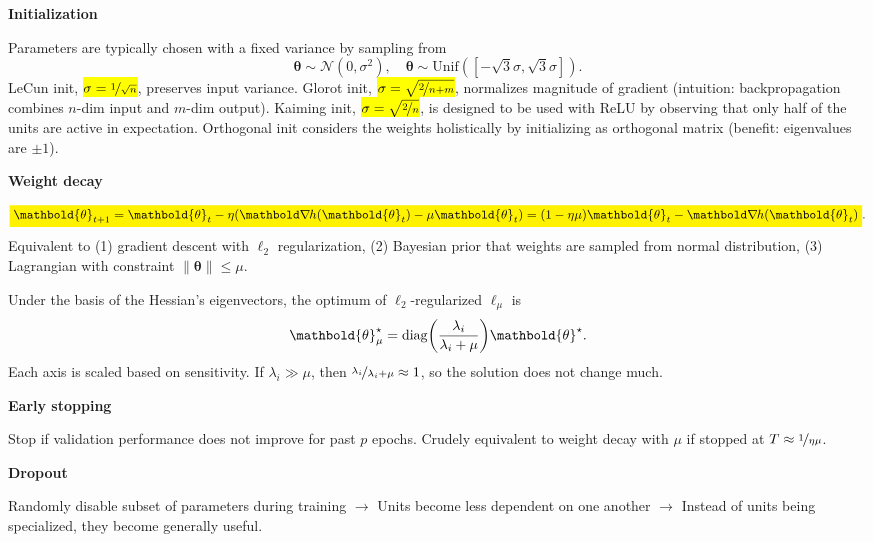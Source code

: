 \documentclass[10pt]{article}
\newenvironment{topic}[1]
{\textbf{\sffamily \footnotesize \colorbox{black}{\rlap{\textbf{\textcolor{white}{#1}}}\hspace{\linewidth}\hspace{-2\fboxsep}}}}
{}
\newenvironment{subtopic}[1]
{\begin{center}\textbf{\footnotesize \sffamily #1}\end{center}}
{}
\renewcommand{\vec}[1]{\ensuremath{\mathbold{#1}}}
\begin{document}
\begin{multicols*}{3}
\begin{topic}{Tricks of the trade}
        \begin{subtopic}{Initialization}
            Parameters are typically chosen with a fixed variance by sampling from \[
                \vec{\theta} \sim \mathcal{N}(0, \sigma^2), \quad \vec{\theta} \sim \mathrm{Unif}([-\sqrt{3}\sigma,\sqrt{3}\sigma]).
            \]
            LeCun init, \hl{$\sigma = \nicefrac{1}{\sqrt{n}}$}, preserves input variance. Glorot init, \hl{$\sigma =
            \sqrt{\nicefrac{2}{n+m}}$}, normalizes magnitude of gradient (intuition: backpropagation combines
            $n$-dim input and $m$-dim output). Kaiming init, \hl{$\sigma = \sqrt{\nicefrac{2}{n}}$}, is designed to
            be used with ReLU by observing that only half of the units are active in expectation. Orthogonal
            init considers the weights holistically by initializing as orthogonal matrix (benefit: eigenvalues
            are $\pm 1$).
        \end{subtopic}

        \begin{subtopic}{Weight decay}
            \[
                \colorbox{yellow}{$\displaystyle \vec{\theta}_{t+1} = \vec{\theta}_t - \eta (\grad{h(\vec{\theta}_t)}{} - \mu \vec{\theta}_t) = (1-\eta \mu) \vec{\theta}_t - \grad{h(\vec{\theta}_t)}{}$}.
            \]
            Equivalent to (1) gradient descent with $\ell_2$ regularization, (2) Bayesian prior that weights
            are sampled from normal distribution, (3) Lagrangian with constraint $\| \vec{\theta} \| \leq \mu$.

            Under the basis of the Hessian's eigenvectors, the optimum of $\ell_2$-regularized $\ell_{\mu}$ is \[
                \vec{\theta}_\mu^\star = \mathrm{diag}\lft( \frac{\lambda_i}{\lambda_i + \mu} \rgt) \vec{\theta}^\star.
            \]
            Each axis is scaled based on sensitivity. If $\lambda_i \gg \mu$, then
            $\nicefrac{\lambda_i}{\lambda_i + \mu} \approx 1$, so the solution does not change much.
        \end{subtopic}

        \begin{subtopic}{Early stopping}
            Stop if validation performance does not improve for past $p$ epochs. Crudely
            equivalent to weight decay with $\mu$ if stopped at $T \approx \nicefrac{1}{\eta \mu}$.
        \end{subtopic}

        \begin{subtopic}{Dropout}
            Randomly disable subset of parameters during training $\to$ Units become less dependent
            on one another $\to$ Instead of units being specialized, they become generally useful.


\end{subtopic}
\end{topic}
\end{multicols*}
\end{document}
